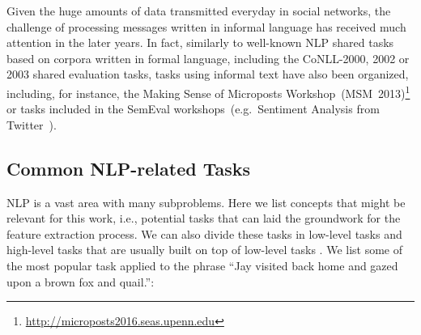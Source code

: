 Given the huge amounts of data transmitted everyday in social networks, the challenge of processing messages written in informal language has received much attention in the later years.
In fact, similarly to well-known NLP shared tasks based on corpora written in formal language, including the CoNLL-2000, 2002 or 2003 shared evaluation tasks\citep{TjongCoNLL2003}, tasks using informal text have also been organized, including, for instance, the Making Sense of Microposts Workshop~(MSM~2013)\footnote{\url{http://microposts2016.seas.upenn.edu}} or tasks included in the SemEval workshops~(e.g.~Sentiment Analysis from Twitter~\citep{rosenthal2015SemEval}).


\subsection{Common NLP-related Tasks} 
\label{nlp_tasks}
NLP is a vast area with many subproblems. Here we list concepts that might be relevant for this work, i.e., potential tasks that can laid the groundwork for the feature extraction process. We can also divide these tasks in low-level tasks and high-level tasks that are usually built on top of low-level tasks \citep{nadkarni2011NLPIntro}. We list some of the most popular task applied to the phrase ``Jay visited back home and gazed upon a brown fox and quail.'':

